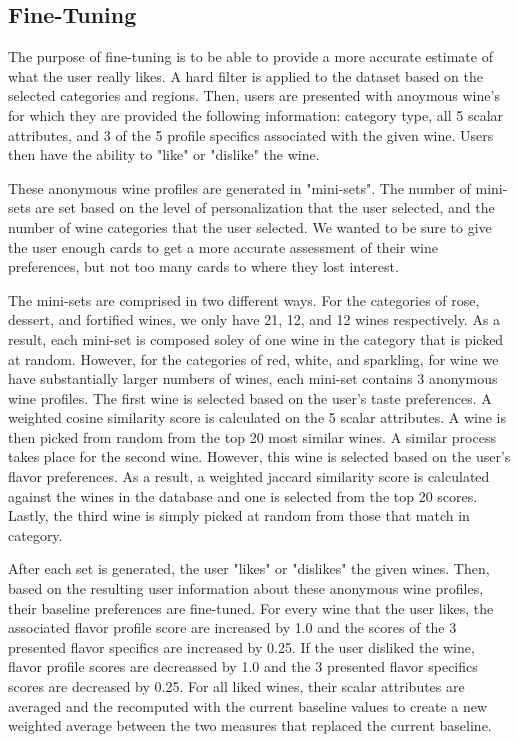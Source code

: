 \documentclass{article} %
\begin{document}
\subsection{Fine-Tuning}
The purpose of fine-tuning is to be able to provide a more accurate estimate of what the user really likes. A hard filter is applied to the dataset based on the selected categories and regions. Then, users are presented with anoymous wine's for which they are provided the following information: 
category type, all 5 scalar attributes, and 3 of the 5 profile specifics associated with the given wine. Users then have the ability to "like" or "dislike" the wine.

These anonymous wine profiles are generated in "mini-sets". The number of mini-sets are set based on the level of personalization that the user selected, and the number of wine categories that the user selected. We wanted to be sure to give the user enough cards to get a more accurate assessment of their wine preferences, but not too many cards to where they lost interest.

The mini-sets are comprised in two different ways. For the categories of rose, dessert, and fortified wines, we only have 21, 12, and 12 wines respectively. As a result, each mini-set is composed soley of one wine in the category that is picked at random. However, for the categories of red, white, and sparkling, for wine we have substantially larger numbers of wines, each mini-set contains 3 anonymous wine profiles. The first wine is selected based on the user's taste preferences. A weighted cosine similarity score is calculated on the 5 scalar attributes. A wine is then picked from random from the top 20 most similar wines. A similar process takes place for the second wine. However, this wine is selected based on the user's flavor preferences. As a result, a weighted jaccard similarity score is calculated against the wines in the database and one is selected from the top 20 scores. Lastly, the third wine is simply picked at random from those that match in category. 

After each set is generated, the user "likes" or "dislikes" the given wines. Then, based on the resulting user information about these anonymous wine profiles, their baseline preferences are fine-tuned. For every wine that the user likes, the associated flavor profile score are increased by 1.0 and the scores of the 3 presented flavor specifics are increased by 0.25. If the user disliked the wine, flavor profile scores are decreassed by 1.0 and the 3 presented flavor specifics scores are decreased by 0.25. For all liked wines, their scalar attributes are averaged and the recomputed with the current baseline values to create a new weighted average between the two measures that replaced the current baseline. 
\end{document}
